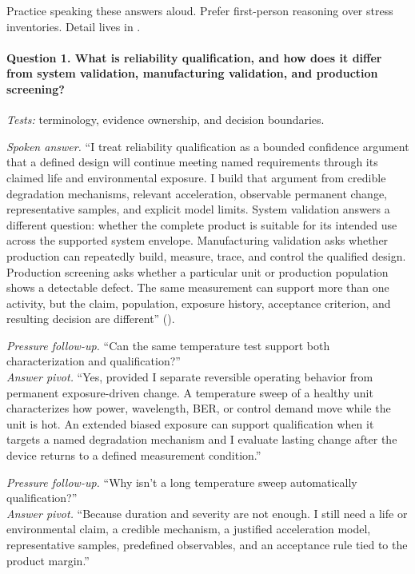 Practice speaking these answers aloud. Prefer first-person reasoning over
stress inventories. Detail lives in
.

\paragraph{Question 1. What is reliability qualification, and how does it
differ from system validation, manufacturing validation, and production
screening?}
\textit{Tests:} terminology, evidence ownership, and decision boundaries.

\textit{Spoken answer.}
``I treat reliability qualification as a bounded confidence argument that a
defined design will continue meeting named requirements through its claimed
life and environmental exposure. I build that argument from credible
degradation mechanisms, relevant acceleration, observable permanent change,
representative samples, and explicit model limits. System validation answers a
different question: whether the complete product is suitable for its intended
use across the supported system envelope. Manufacturing validation asks whether
production can repeatedly build, measure, trace, and control the qualified
design. Production screening asks whether a particular unit or production
population shows a detectable defect. The same measurement can support more
than one activity, but the claim, population, exposure history, acceptance
criterion, and resulting decision are different''
().

\textit{Pressure follow-up.} ``Can the same temperature test support both
characterization and qualification?''\\
\textit{Answer pivot.} ``Yes, provided I separate reversible operating behavior
from permanent exposure-driven change. A temperature sweep of a healthy unit
characterizes how power, wavelength, BER, or control demand move while the unit
is hot. An extended biased exposure can support qualification when it targets a
named degradation mechanism and I evaluate lasting change after the device
returns to a defined measurement condition.''

\textit{Pressure follow-up.} ``Why isn't a long temperature sweep automatically
qualification?''\\
\textit{Answer pivot.} ``Because duration and severity are not enough. I still
need a life or environmental claim, a credible mechanism, a justified
acceleration model, representative samples, predefined observables, and an
acceptance rule tied to the product margin.''

